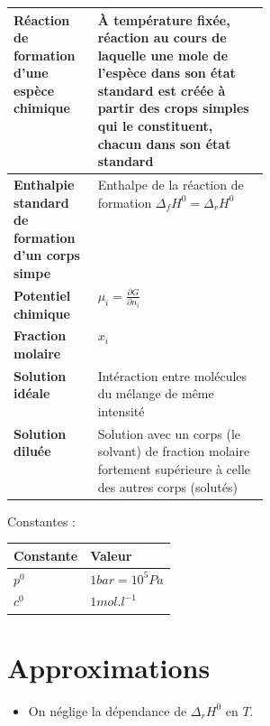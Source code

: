 \documentclass[12pt,a4paper] {article}
\begin{document}
\begin{tabularx}{\linewidth}{|>{\bfseries}p{0.33\linewidth}|X|}
    Réaction de formation d'une espèce chimique & À température fixée, réaction au cours de laquelle une mole de l'espèce dans son état standard est créée à partir des crops simples qui le constituent, chacun dans son état standard \\ \hline
    Enthalpie standard de formation d'un corps simpe & Enthalpe de la réaction de formation $\Delta_f H^0 = \Delta_r H^0$ \\ \hline
    Potentiel chimique & $\mu_i = \frac{\partial G}{\partial n_i}$ \\ \hline
    Fraction molaire & $x_i$ \\ \hline
    Solution idéale & Intéraction entre molécules du mélange de même intensité \\ \hline
    Solution diluée & Solution avec un corps (le solvant) de fraction molaire fortement supérieure à celle des autres corps (solutés) \\ \hline
\end{tabularx}

Constantes : \\
\begin{center}\begin{tabular}{|l|l|} \hline
    \bf{Constante} & \bf{Valeur} \\ \hline
    $p^0$ & $1 bar = 10^5 Pa$ \\ \hline
    $c^0$ & $1mol.l^{-1}$ \\ \hline
\end{tabular}\end{center}

\section{Approximations}
\begin{itemize}
    \item On néglige la dépendance de $\Delta_r H^0$ en $T$.
\end{itemize}
\end{document}
